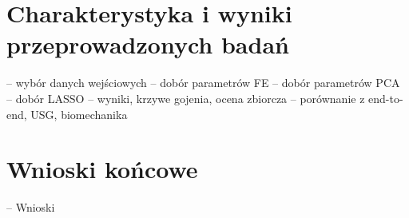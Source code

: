 {\let\clearpage\relax\chapter*{Charakterystyka i wyniki przeprowadzonych badań}}

-- wybór danych wejściowych
-- dobór parametrów FE
-- dobór parametrów PCA
-- dobór LASSO
-- wyniki, krzywe gojenia, ocena zbiorcza
-- porównanie z end-to-end, USG, biomechanika

{\let\clearpage\relax\chapter*{Wnioski końcowe}}

-- Wnioski
